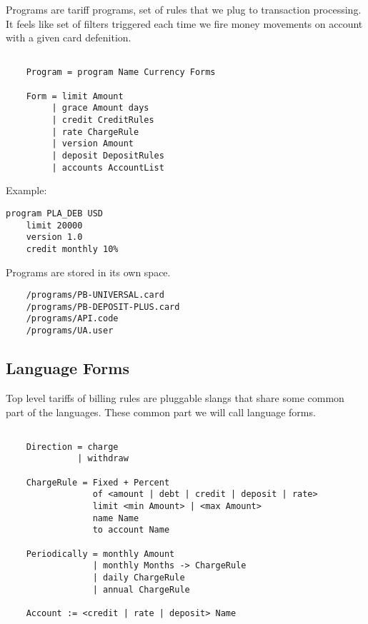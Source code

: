 Programs are tariff programs, set of rules that we plug to transaction processing.
It feels like set of filters triggered each time we fire money
movements on account with a given card defenition.

\vspace{1\baselineskip}
\begin{lstlisting}[caption=BNF]

    Program = program Name Currency Forms

    Form = limit Amount
         | grace Amount days
         | credit CreditRules
         | rate ChargeRule
         | version Amount
         | deposit DepositRules
         | accounts AccountList
\end{lstlisting}
\vspace{1\baselineskip}

Example:

\vspace{1\baselineskip}
\begin{lstlisting}[caption=credit.card]
    program PLA_DEB USD
    limit 20000
    version 1.0
    credit monthly 10%
\end{lstlisting}
\vspace{1\baselineskip}


Programs are stored in its own space.

\vspace{1\baselineskip}
\begin{lstlisting}
    /programs/PB-UNIVERSAL.card
    /programs/PB-DEPOSIT-PLUS.card
    /programs/API.code
    /programs/UA.user
\end{lstlisting}
\vspace{1\baselineskip}

\newpage
\subsection{Language Forms}

Top level tariffs of billing rules are pluggable slangs that
share some common part of the languages. These common part we will
call language forms.

\vspace{1\baselineskip}
\begin{lstlisting}[caption=BNF]

    Direction = charge 
              | withdraw

    ChargeRule = Fixed + Percent
                 of <amount | debt | credit | deposit | rate>
                 limit <min Amount> | <max Amount>
                 name Name
                 to account Name

    Periodically = monthly Amount 
                 | monthly Months -> ChargeRule
                 | daily ChargeRule
                 | annual ChargeRule

    Account := <credit | rate | deposit> Name

\end{lstlisting}
\vspace{1\baselineskip}

